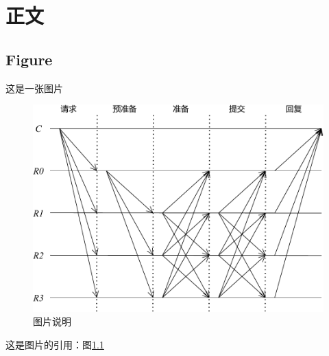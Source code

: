 \chapter{正文}

\section{Figure}

这是一张图片

\begin{figure}[ht]  %
    \centering  %
    \includegraphics[width=0.85\columnwidth]{figures/pbft.pdf}  %
    \caption{图片说明}
    \label{fig:dag}  %
\end{figure}

这是图片的引用：图\ref{fig:dag}
